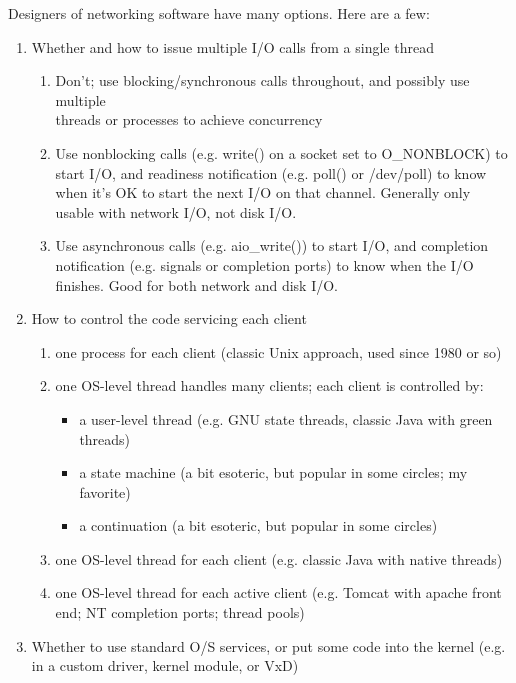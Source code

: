 \documentclass[12pt, twoside, a4paper, xetex]{report}
\begin{document}
Designers of networking software have many options. Here are a few:

	\begin{enumerate}
	\item Whether and how to issue multiple I/O calls from a single thread
		\begin{enumerate}
		\item Don't; use blocking/synchronous calls throughout, and possibly use multiple \\threads or processes to 
		    achieve concurrency
		\item Use nonblocking calls (e.g. write() on a socket set to O\_NONBLOCK) to start I/O, and readiness 
		    notification (e.g. poll() or /dev/poll) to know when it's OK to start the next I/O on that channel. 
		    Generally only usable with network I/O, not disk I/O.
		\item Use asynchronous calls (e.g. aio\_write()) to start I/O, and completion notification (e.g. signals or 
			completion ports) to know when the I/O finishes. Good for both network and disk I/O.
		
		\end{enumerate}
	\item How to control the code servicing each client
		\begin{enumerate}
		\item one process for each client (classic Unix approach, used since 1980 or so)
		\item one OS-level thread handles many clients; each client is controlled by:
			
			\begin{itemize}
			\item a user-level thread (e.g. GNU state threads, classic Java with green \\threads)
			\item a state machine (a bit esoteric, but popular in some circles; my favorite)
			\item a continuation (a bit esoteric, but popular in some circles)
			\end{itemize}
		\item one OS-level thread for each client (e.g. classic Java with native threads)
		\item one OS-level thread for each active client (e.g. Tomcat with apache front end; NT completion ports; 
			thread pools)
		\end{enumerate}
	\item Whether to use standard O/S services, or put some code into the kernel (e.g. in a custom driver, kernel 
		module, or VxD)
	\end{enumerate}
	
\end{document}
